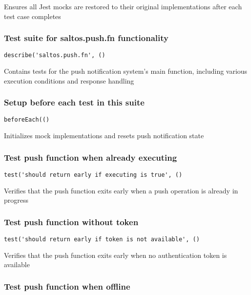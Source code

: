 \documentclass[a4paper]{article}
\begin{document}
Ensures all Jest mocks are restored to their original implementations
after each test case completes

\hypertarget{toc244}{}
\subsubsection{Test suite for saltos.push.fn functionality}

\begin{lstlisting}
describe('saltos.push.fn', ()
\end{lstlisting}

Contains tests for the push notification system's main function,
including various execution conditions and response handling

\hypertarget{toc245}{}
\subsubsection{Setup before each test in this suite}

\begin{lstlisting}
beforeEach(()
\end{lstlisting}

Initializes mock implementations and resets push notification state

\hypertarget{toc246}{}
\subsubsection{Test push function when already executing}

\begin{lstlisting}
test('should return early if executing is true', ()
\end{lstlisting}

Verifies that the push function exits early when a push operation
is already in progress

\hypertarget{toc247}{}
\subsubsection{Test push function without token}

\begin{lstlisting}
test('should return early if token is not available', ()
\end{lstlisting}

Verifies that the push function exits early when no authentication
token is available

\hypertarget{toc248}{}
\subsubsection{Test push function when offline}
\end{document}
